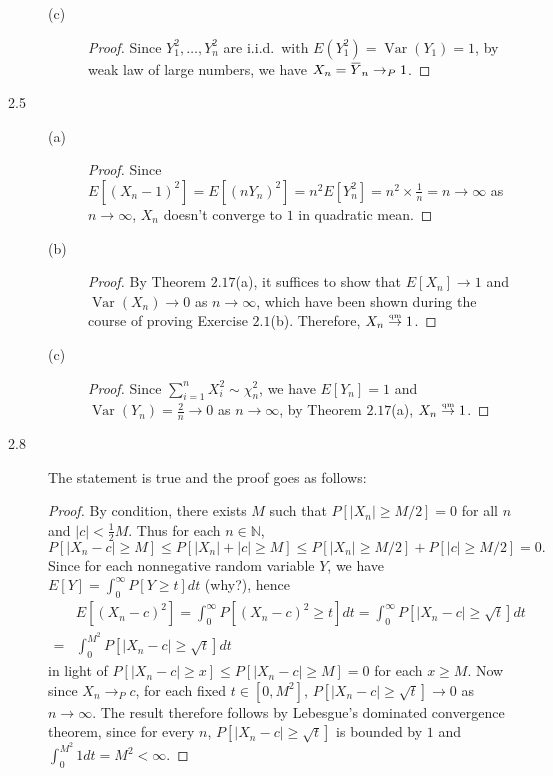 \documentclass{article}
\newcommand{\nn}{\mathbb{N}}
\newcommand{\overbar}[1]{\mkern 1.5mu\overline{\mkern-1.5mu#1\mkern-1.5mu}\mkern 1.5mu}
\DeclareMathOperator*{\Var}{Var}
\theoremstyle{definition}
\theoremstyle{plain}
\theoremstyle{remark}
\begin{document}
\begin{description}
\begin{description}
\item[(c)] 
\begin{proof}
Since $Y_1^2, \ldots, Y_n^2$ are i.i.d.\ with $E(Y_1^2) = \Var(Y_1) = 1$, by weak law of large numbers, we have $X_n = \overbar{Y}_n \to_P 1$.
\end{proof}
\end{description}

\item[2.5]
\begin{description}
\item[(a)]
\begin{proof}
Since $E[(X_n - 1)^2] = E[(nY_n)^2] = n^2E[Y_n^2] = n^2 \times \frac{1}{n} = n \to \infty$ as $n \to \infty$, $X_n$ doesn't converge to $1$ in quadratic mean. 
\end{proof}

\item[(b)] 
\begin{proof}
By Theorem $2.17$(a), it suffices to show that $E[X_n] \to 1$ and $\Var(X_n) \to 0$ as $n \to \infty$, which have been shown during the course of proving Exercise $2.1$(b). Therefore, $X_n \overset{\text{\tiny qm}}{\to} 1$.
\end{proof}

\item[(c)]
\begin{proof}
Since $\sum_{i = 1}^n X_i^2 \sim \chi_n^2$, we have $E[Y_n] = 1$ and $\Var(Y_n) = \frac{2}{n} \to 0$ as $n \to \infty$, by Theorem $2.17$(a), $X_n \overset{\text{\tiny qm}}{\to} 1$.
\end{proof}
\end{description}

\item[2.8] The statement is true and the proof goes as follows:
\begin{proof}
By condition, there exists $M$ such that $P[|X_n| \geq M/2] = 0$ for all $n$ and $|c| < \frac{1}{2}M$. Thus for each $n \in \nn$,
$$P[|X_n - c| \geq M] \leq P[|X_n| + |c| \geq M] \leq P[|X_n| \geq M/2] + P[|c| \geq M/2] = 0.$$
Since for each nonnegative random variable $Y$, we have $E[Y] = \int_0^\infty P[Y \geq t] dt$ (why?), hence
\begin{align*}
& E[(X_n - c)^2] = \int_0^\infty P[(X_n - c)^2 \geq t] dt = \int_0^\infty P[|X_n - c| \geq \sqrt{t}] dt \\
= & \int_0^{M^2} P[|X_n - c| \geq \sqrt{t}] dt
\end{align*}
in light of $P[|X_n - c| \geq x] \leq P[|X_n - c| \geq M] = 0$ for each $x \geq M$. Now since $X_n \to_P c$, for each fixed $t \in [0, M^2]$, $P[|X_n - c| \geq \sqrt{t}] \to 0$ as $n \to \infty$. The result therefore follows by Lebesgue's dominated convergence theorem, since for every $n$, $P[|X_n - c| \geq \sqrt{t}]$ is bounded by $1$ and $\int_0^{M^2} 1 dt = M^2 < \infty$.
\end{proof}


\end{description}
\end{document}
